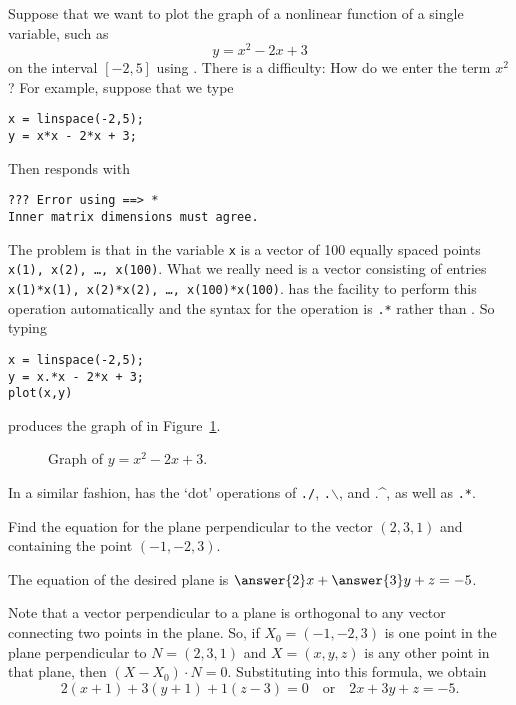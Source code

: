 \documentclass{ximera}
\begin{document}
Suppose that we want to plot the graph of a nonlinear function of
a single variable, such as
\begin{equation}  \label{E:quadex}
y = x^2 - 2x + 3
\end{equation}
on the interval $[-2,5]$ using \Matlabp.  There is a difficulty:  How
do we enter the term $x^2$?  For example, suppose that we type
\begin{verbatim}
x = linspace(-2,5);
y = x*x - 2*x + 3;
\end{verbatim}
Then \Matlab responds with
\begin{verbatim}
??? Error using ==> *
Inner matrix dimensions must agree.
\end{verbatim}
The problem is that in \Matlab the variable {\tt x} is a vector of
100 equally spaced points {\tt x(1), x(2), \ldots, x(100)}.  What we
really need is a vector consisting of entries {\tt x(1)*x(1), x(2)*x(2),
\ldots, x(100)*x(100)}.  \Matlab has the facility to perform this
operation automatically and the syntax for the operation is {\tt .*}
rather than {\tt *}.  So typing
\begin{verbatim}
x = linspace(-2,5);
y = x.*x - 2*x + 3;
plot(x,y)
\end{verbatim}
produces the graph of  in Figure~\ref{F:quadex}.
\begin{figure}[htb]
              \centerline{%
              }
              \caption{Graph of $y = x^2 - 2x + 3$.}
              \label{F:quadex}
\end{figure}
In a similar fashion, \Matlab has the `dot' operations of
{\tt ./},
{\tt .$\backslash$}, and  .\^{}, as well
as {\tt .*}.

\EXER



\TEXER

\begin{exercise} \label{c2.2.5}
Find the equation for the plane perpendicular to the vector $(2,3,1)$
and containing the point $(-1,-2,3)$.
\begin{prompt}
  The equation of the desired plane is $\answer{2}x + \answer{3}y + z = -5$.
\end{prompt}
\begin{hint}
  Note that a vector perpendicular to a plane is orthogonal
to any vector connecting two points in the plane.  So,
if $X_0 = (-1,-2,3)$ is one point in the plane perpendicular to
$N = (2,3,1)$ and $X = (x,y,z)$ is any other point in that plane,
then $(X - X_0) \cdot N = 0$.  Substituting into this formula, we obtain
\[
2(x + 1) + 3(y + 1) + 1(z - 3) = 0\quad\mbox{or}\quad
2x + 3y + z = -5.
\]
\end{hint}
\end{exercise}
\end{document}
